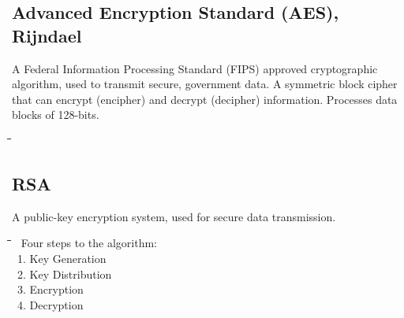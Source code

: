 \documentclass[10pt,letterpaper]{scrartcl}
\newcommand{\tbul}{\textbullet}
\newcommand{\tabDef}{\hspace{2em}\=\hspace{2em}\=\hspace{2em}\=\hspace{2em}\=\kill}
\begin{document}
\subsection{Advanced Encryption Standard (AES), Rijndael}
A Federal Information Processing Standard (FIPS) approved cryptographic algorithm, used to transmit secure, government data. A symmetric block cipher that can encrypt (encipher) and decrypt (decipher) information. Processes data blocks of 128-bits.
\begin{tabbing}\tabDef 

\end{tabbing}

\subsection{RSA}
A public-key encryption system, used for secure data transmission. 
\begin{tabbing}\tabDef
\tbul\ Four steps to the algorithm:\\
\>\ 1. Key Generation\\
\>\ 2. Key Distribution\\
\>\ 3. Encryption \\
\>\ 4. Decryption
\end{tabbing}
\end{document}
